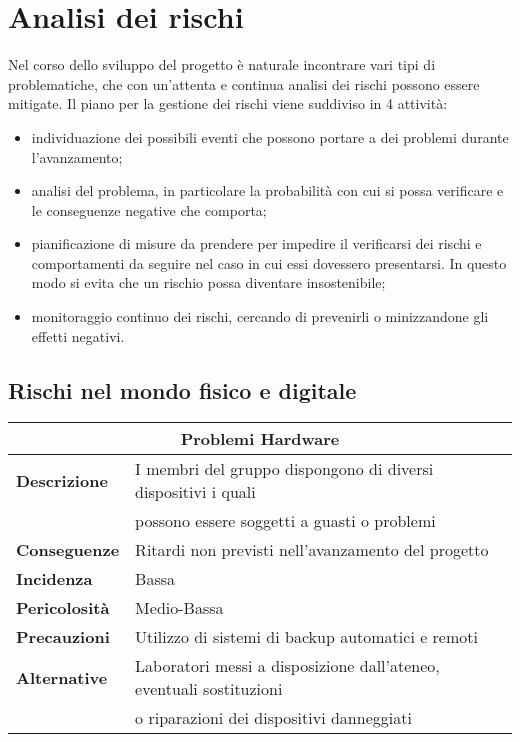 \chapter{Analisi dei rischi}
Nel corso dello sviluppo del progetto è naturale incontrare vari tipi di problematiche, che con un'attenta e continua analisi dei rischi possono essere mitigate. Il piano per la gestione dei rischi viene suddiviso in 4 attività:
\begin{itemize}
    \item individuazione dei possibili eventi che possono portare a dei problemi durante l'avanzamento;
    \item analisi del problema, in particolare la probabilità con cui si possa verificare e le conseguenze
    negative che comporta;
    \item pianificazione di misure da prendere per impedire il verificarsi dei rischi e comportamenti da seguire nel caso in cui essi dovessero presentarsi. In questo modo si evita che un rischio possa diventare insostenibile;
    \item monitoraggio continuo dei rischi, cercando di prevenirli o minizzandone gli effetti negativi.
\end{itemize}

\section{Rischi nel mondo fisico e digitale}

\begin{center}
    \begin{tabularx}{0.8\linewidth}{l|l}
        \multicolumn{2}{c}{\textbf{Problemi Hardware}}                                                          \\
        \hline{\textbf{Descrizione}}    & I membri del gruppo dispongono di diversi dispositivi i quali         \\ 
                                        & possono essere soggetti a guasti o problemi                           \\
        \textbf{Conseguenze}            & Ritardi non previsti nell'avanzamento del progetto                    \\
        \textbf{Incidenza}              & Bassa                                                                 \\
        \textbf{Pericolosità}           & Medio-Bassa                                                           \\
        \textbf{Precauzioni}            & Utilizzo di sistemi di backup automatici e remoti                     \\
        \textbf{Alternative}            & Laboratori messi a disposizione dall'ateneo, eventuali sostituzioni   \\ 
                                        & o riparazioni dei dispositivi danneggiati                             \\     
    \end{tabularx}
\end{center}

